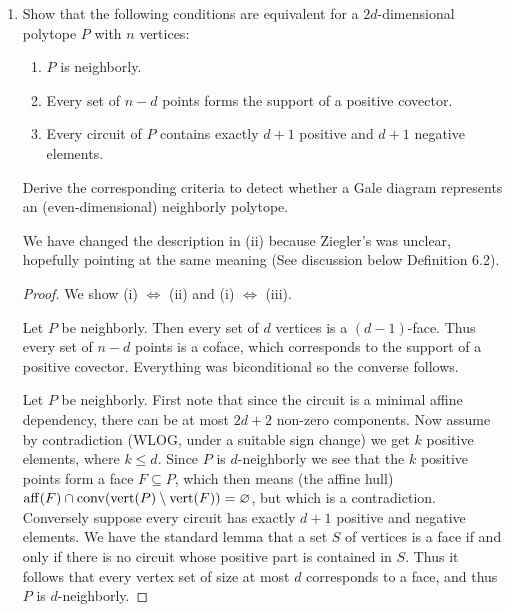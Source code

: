 \documentclass{article}
\begin{document}
\begin{enumerate}
\begin{proof}
    To show duality of the oriented matroids, it suffices to show that there is a bijection between $\ca{C}(C_{n-d-2})$, the circuits of the (oriented matroid of the) moment curve in $\mathbb{R}^{n-d-2}$, and $\ca{C}^*(C_d(n))$, the cocircuits of the cyclic polytope.
\end{proof}

\item Show that the following conditions are equivalent for a $2d$-dimensional polytope $P$ with $n$ vertices:

\begin{enumerate}[label=(\roman*)]
\item $P$ is neighborly.
\item Every set of $n-d$ points forms the support of a positive covector.
\item Every circuit of $P$ contains exactly $d+1$ positive and $d+1$ negative elements. 
\end{enumerate}

Derive the corresponding criteria to detect whether a Gale diagram represents an (even-dimensional) neighborly polytope.

\begin{remark}
    We have changed the description in (ii) because Ziegler's was unclear, hopefully pointing at the same meaning  (See discussion below Definition 6.2).
\end{remark}

\begin{proof}
We show (i) $\iff$ (ii) and (i) $\iff$ (iii).

Let $P$ be neighborly. Then every set of $d$ vertices is a $(d-1)$-face. Thus every set of $n-d$ points is a coface, which corresponds to the support of a positive covector. Everything was biconditional so the converse follows.

Let $P$ be neighborly. First note that since the circuit is a minimal affine dependency, there can be at most $2d+2$ non-zero components. Now assume by contradiction (WLOG, under a suitable sign change) we get $k$ positive elements, where $k \leq d$. Since $P$ is $d$-neighborly we see that the $k$ positive points form a face $F \subseteq P$, which then means (the affine hull) $\operatorname{aff}(F) \cap \operatorname{conv}(\operatorname{vert}(P) \setminus \operatorname{vert}(F)) = \varnothing$, but which is a contradiction. Conversely suppose every circuit has exactly $d+1$ positive and negative elements. We have the standard lemma that a set $S$ of vertices is a face if and only if there is no circuit whose positive part is contained in $S$. Thus it follows that every vertex set of size at most $d$ corresponds to a face, and thus $P$ is $d$-neighborly.


\end{proof}
\end{enumerate}
\end{document}
